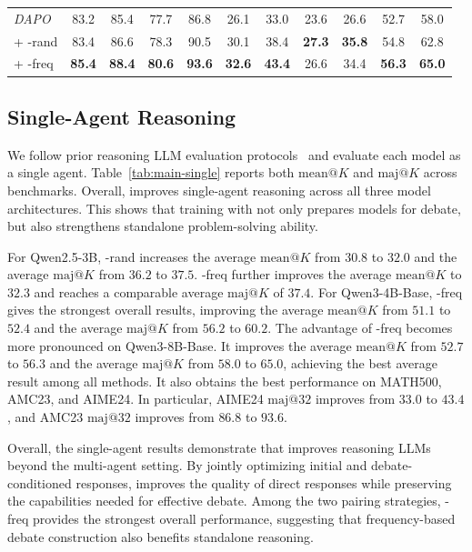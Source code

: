 \begin{table}[t]
\begin{center}
\begin{small}
{\begin{tabular}{lcccccccccc}
          \midrule
          \emph{DAPO}      & 83.2 & 85.4 & 77.7 & 86.8 & 26.1 & 33.0 & 23.6 & 26.6 & 52.7 & 58.0 \\
          + \SDRL{}-rand   & 83.4 & 86.6 & 78.3 & 90.5 & 30.1 & 38.4 & \textbf{27.3} & \textbf{35.8} & 54.8 & 62.8 \\
          + \SDRL{}-freq   & \textbf{85.4} & \textbf{88.4} & \textbf{80.6} & \textbf{93.6} & \textbf{32.6} & \textbf{43.4} & 26.6 & 34.4 & \textbf{56.3} & \textbf{65.0} \\
          \bottomrule
        \end{tabular}
        }
    \end{small}
  \end{center}
  \vskip -0.1in
\end{table}

\subsection{Single-Agent Reasoning}
\label{single_exp}

We follow prior reasoning LLM evaluation protocols~\cite{yu2025dapo} and evaluate each model as a single agent. Table~\ref{tab:main-single} reports both $\mathrm{mean}@K$ and $\mathrm{maj}@K$ across benchmarks. Overall, \SDRL{} improves single-agent reasoning across all three model architectures. This shows that training with \SDRL{} not only prepares models for debate, but also strengthens standalone problem-solving ability.

For Qwen2.5-3B, \SDRL{}-rand increases the average $\mathrm{mean}@K$ from $30.8$ to $32.0$ and the average $\mathrm{maj}@K$ from $36.2$ to $37.5$. \SDRL{}-freq further improves the average $\mathrm{mean}@K$ to $32.3$ and reaches a comparable average $\mathrm{maj}@K$ of $37.4$. For Qwen3-4B-Base, \SDRL{}-freq gives the strongest overall results, improving the average $\mathrm{mean}@K$ from $51.1$ to $52.4$ and the average $\mathrm{maj}@K$ from $56.2$ to $60.2$.
The advantage of \SDRL{}-freq becomes more pronounced on Qwen3-8B-Base. It improves the average $\mathrm{mean}@K$ from $52.7$ to $56.3$ and the average $\mathrm{maj}@K$ from $58.0$ to $65.0$, achieving the best average result among all methods. It also obtains the best performance on MATH500, AMC23, and AIME24. In particular, AIME24 $\mathrm{maj}@32$ improves from $33.0$ to $43.4$, and AMC23 $\mathrm{maj}@32$ improves from $86.8$ to $93.6$.

Overall, the single-agent results demonstrate that \SDRL{} improves reasoning LLMs beyond the multi-agent setting. By jointly optimizing initial and debate-conditioned responses, \SDRL{} improves the quality of direct responses while preserving the capabilities needed for effective debate. Among the two pairing strategies, \SDRL{}-freq provides the strongest overall performance, suggesting that frequency-based debate construction also benefits standalone reasoning.

